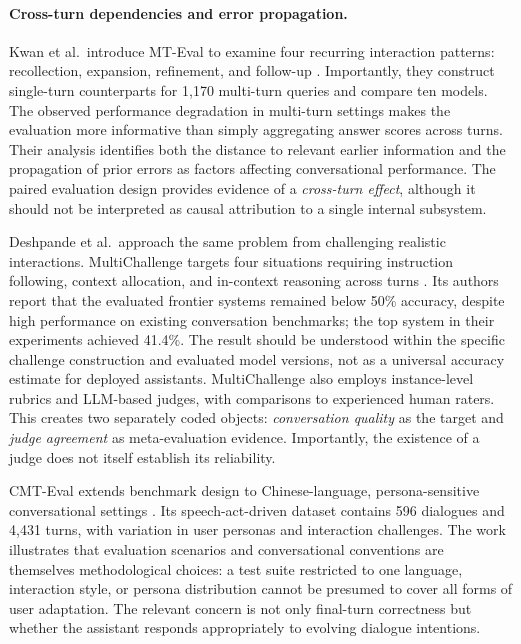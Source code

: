 \paragraph{Cross-turn dependencies and error propagation.}
Kwan et al.\ introduce MT-Eval to examine four recurring interaction patterns: recollection, expansion, refinement, and follow-up \cite{kwan2024mteval}. Importantly, they construct single-turn counterparts for 1,170 multi-turn queries and compare ten models. The observed performance degradation in multi-turn settings makes the evaluation more informative than simply aggregating answer scores across turns. Their analysis identifies both the distance to relevant earlier information and the propagation of prior errors as factors affecting conversational performance. The paired evaluation design provides evidence of a \emph{cross-turn effect}, although it should not be interpreted as causal attribution to a single internal subsystem.

Deshpande et al.\ approach the same problem from challenging realistic interactions. MultiChallenge targets four situations requiring instruction following, context allocation, and in-context reasoning across turns \cite{deshpande2025multichallenge}. Its authors report that the evaluated frontier systems remained below 50\% accuracy, despite high performance on existing conversation benchmarks; the top system in their experiments achieved 41.4\%. The result should be understood within the specific challenge construction and evaluated model versions, not as a universal accuracy estimate for deployed assistants. MultiChallenge also employs instance-level rubrics and LLM-based judges, with comparisons to experienced human raters. This creates two separately coded objects: \emph{conversation quality} as the target and \emph{judge agreement} as meta-evaluation evidence. Importantly, the existence of a judge does not itself establish its reliability.

CMT-Eval extends benchmark design to Chinese-language, persona-sensitive conversational settings \cite{tian2025cmteval}. Its speech-act-driven dataset contains 596 dialogues and 4,431 turns, with variation in user personas and interaction challenges. The work illustrates that evaluation scenarios and conversational conventions are themselves methodological choices: a test suite restricted to one language, interaction style, or persona distribution cannot be presumed to cover all forms of user adaptation. The relevant concern is not only final-turn correctness but whether the assistant responds appropriately to evolving dialogue intentions.

